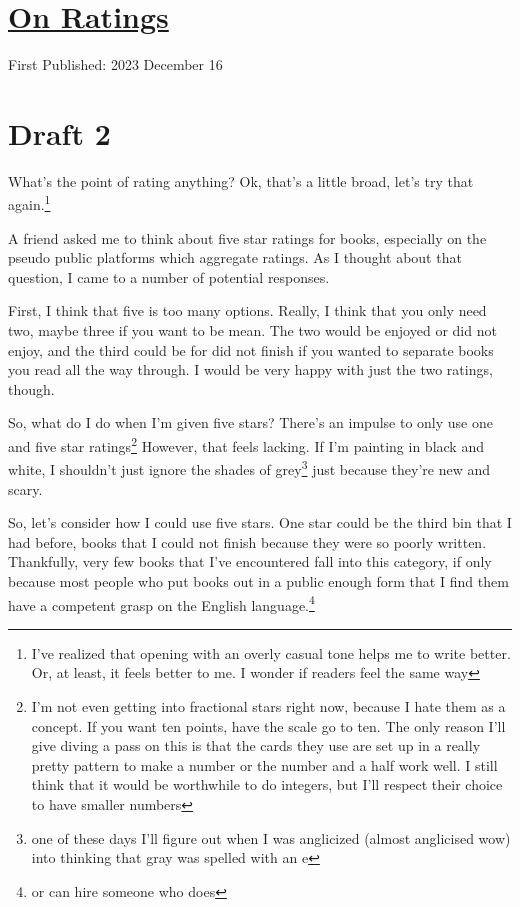 \documentclass[12pt]{article}[titlepage]
\newcommand{\1}{\={a}}
\newcommand{\2}{\={e}}
\newcommand{\3}{\={\i}}
\newcommand{\4}{\=o}
\newcommand{\5}{\=u}
\newcommand{\6}{\={A}}
\renewcommand{\,}{\textsuperscript{,}}
\begin{document}
\doublespacing
\section{\href{ratings.html}{On Ratings}}
First Published: 2023 December 16

\section{Draft 2}
What's the point of rating anything?
Ok, that's a little broad, let's try that again.\footnote{I've realized that opening with an overly casual tone helps me to write better. Or, at least, it feels better to me. I wonder if readers feel the same way}

A friend asked me to think about five star ratings for books, especially on the pseudo public platforms which aggregate ratings.
As I thought about that question, I came to a number of potential responses.

First, I think that five is too many options.
Really, I think that you only need two, maybe three if you want to be mean.
The two would be enjoyed or did not enjoy, and the third could be for did not finish if you wanted to separate books you read all the way through.
I would be very happy with just the two ratings, though.

So, what do I do when I'm given five stars?
There's an impulse to only use one and five star ratings\footnote{I'm not even getting into fractional stars right now, because I hate them as a concept.
If you want ten points, have the scale go to ten.
The only reason I'll give diving a pass on this is that the cards they use are set up in a really pretty pattern to make a number or the number and a half work well.
I still think that it would be worthwhile to do integers, but I'll respect their choice to have smaller numbers}
However, that feels lacking.
If I'm painting in black and white, I shouldn't just ignore the shades of grey\footnote{one of these days I'll figure out when I was anglicized (almost anglicised wow) into thinking that gray was spelled with an e} just because they're new and scary.

So, let's consider how I could use five stars.
One star could be the third bin that I had before, books that I could not finish because they were so poorly written.
Thankfully, very few books that I've encountered fall into this category, if only because most people who put books out in a public enough form that I find them have a competent grasp on the English language.\footnote{or can hire someone who does}
\end{document}
